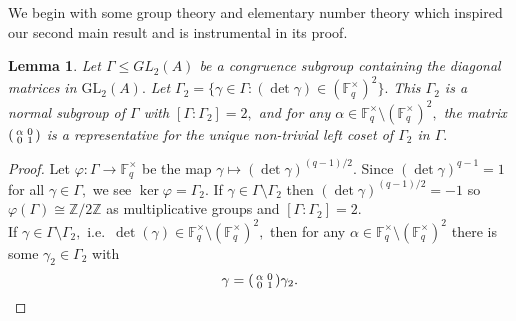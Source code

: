 \documentclass[11pt]{amsart}
\newtheorem{lemma}[theorem]{Lemma}
\newtheorem{corollary}[theorem]{Corollary}
\theoremstyle{definition}
\newenvironment{psmallmatrix}
{\left(\begin{smallmatrix}}
	{\end{smallmatrix}\right)}
\numberwithin{equation}{section}
\newcommand{\GL}{\mathrm{GL}} 	%
\newcommand{\bbF}{\mathbb{F}}		%
\newcommand{\bbZ}{\mathbb{Z}}		%
\begin{document}
		We begin with some group theory and elementary number theory which inspired our second main result and is instrumental in its proof.
		\begin{lemma}\label{l: Gamma2 normal, index 2, coset rep}
			Let $\Gamma \leq GL_2(A)$ be a congruence subgroup containing the diagonal matrices in $\GL_2(A).$ Let $\Gamma_2=\{\gamma\in \Gamma: (\det \gamma)\in (\bbF_q^{\times})^2 \}.$ This $\Gamma_2$ is a normal subgroup of $\Gamma$ with $[\Gamma:\Gamma_2]=2,$ and for any $\alpha\in \bbF_q^{\times}\setminus(\bbF_q^{\times})^2,$ the matrix $\begin{psmallmatrix}\alpha&0\\0&1\end{psmallmatrix}$ is a representative for the unique non-trivial left coset of $\Gamma_2$ in $\Gamma.$
		\end{lemma}
		\begin{proof}
			Let $\varphi:\Gamma\to \bbF_q^{\times}$ be the map $\gamma\mapsto (\det\gamma)^{(q-1)/2}.$ Since $(\det\gamma)^{q-1}=1$ for all $\gamma\in \Gamma,$ we see $\ker\varphi=\Gamma_2.$ If $\gamma\in \Gamma\setminus\Gamma_2$ then $(\det\gamma)^{(q-1)/2}= -1$ so $\varphi(\Gamma)\cong \bbZ/2\bbZ$ as multiplicative groups and $[\Gamma:\Gamma_2]=2.$\\
			
			If $\gamma\in \Gamma\setminus \Gamma_2,$ i.e.\ $\det(\gamma)\in \bbF_q^{\times}\setminus(\bbF_q^{\times})^2,$ then for any $\alpha\in \bbF_q^{\times}\setminus(\bbF_q^{\times})^2$ there is some $\gamma_2\in \Gamma_2$ with 
			\[\gamma=\begin{psmallmatrix}\alpha&0\\0&1\end{psmallmatrix}\gamma_2.\]
		\end{proof}
		
		
\end{document}
